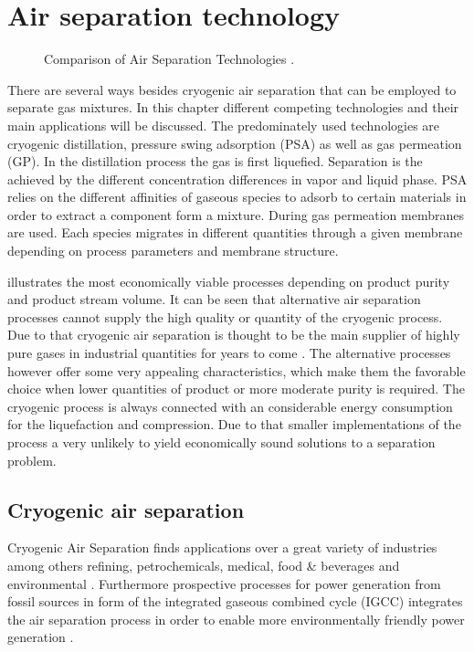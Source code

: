 \chapter{Air separation technology}
\label{chp:airsep}
\begin{figure}[h]
	
	\caption{Comparison of Air Separation Technologies \cite{Prasad.1994}.}
	\label{fig:tech_compar}
\end{figure}

There are several ways besides cryogenic air separation that can be employed to separate gas mixtures.
In this chapter different competing technologies and their main applications will be discussed. The
predominately used technologies are cryogenic distillation, pressure swing adsorption (PSA) as well as
gas permeation (GP). In the distillation process the gas is first liquefied. Separation is the achieved
by the different concentration differences in vapor and liquid phase. PSA relies on the different affinities
of gaseous species to adsorb to certain materials in order to extract a component form a mixture. During gas
permeation membranes are used. Each species migrates in different quantities through a given membrane
depending on process parameters and membrane structure.

 illustrates the most economically viable processes depending on product
purity and product stream volume. It can be seen that alternative air separation processes
cannot supply the high quality or quantity of the cryogenic process. Due to that cryogenic air separation is
thought to be the main supplier of highly pure gases in industrial quantities for years to come
\cite{Castle.2002}.
The alternative processes however offer some very appealing characteristics, which make them the
favorable choice when lower quantities of product or more moderate purity is required. The cryogenic
process is always connected with an considerable energy consumption for the liquefaction and compression.
Due to that smaller implementations of the process a very unlikely to yield economically sound solutions
to a separation problem.

\addref

\section{Cryogenic air separation}
\label{sec:cryo_air_sep}
Cryogenic Air Separation finds applications over a great variety of industries among others refining, petrochemicals, medical, food \& beverages and environmental \cite{Sirdeshpande.2005}. Furthermore
prospective processes for power generation from fossil sources in form of the integrated gaseous combined
cycle (IGCC) integrates the air separation process in order to enable more environmentally friendly power
generation \cite{Mahapatra.2010}.

